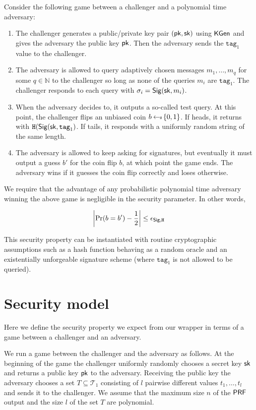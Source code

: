 \documentclass[12pt]{article}
\begin{document}
Consider the following game between a challenger and a polynomial time adversary:

\begin{enumerate}
\item The challenger generates a public/private key pair $(\mathsf{pk}, \mathsf{sk})$ using $\mathsf{KGen}$ and gives the adversary the public key $\mathsf{pk}$. Then the adversary sends the $\mathrm{\texttt{tag}_1}$ value to the challenger.

\item The adversary is allowed to query adaptively chosen messages $m_1,
	\dots , m_q$ for some $q \in \mathbb{N}$ to the challenger so long as none of the queries $m_i$ are $\texttt{tag}_1$. The
		challenger responds to each query with $\sigma_{i}=
		\mathsf{Sig}{(\mathsf{sk}, m_i})$. 

\item When the adversary decides to, it outputs a so-called test query. At this point, the challenger flips an unbiased coin $b \hskip2.3pt{\gets\!\!\mbox{\tiny${\$}$\normalsize}}\, \{0, 1\}$. If heads, it returns with $ \texttt{H}(\mathsf{Sig} (\mathsf{sk}, \mathrm{\texttt{tag}_1})$. If tails, it responds with a uniformly random string of the same length.

\item The adversary is allowed to keep asking for signatures, but eventually it must output a guess $b'$ for the coin flip $b$, at which point the game ends. The adversary wins if it guesses the coin flip correctly and loses otherwise.
\end{enumerate}

We require that the advantage of any probabilistic polynomial time adversary winning the above game is negligible in the security parameter. In other words,

$$\left \vert \Pr(b = b') -\frac{1}{2} \right \vert \le \epsilon_{\mathsf{Sig}, \texttt{H}}$$

This security property can be instantiated with routine cryptographic assumptions such as a hash function behaving as a random oracle and an existentially unforgeable signature scheme (where $\texttt{tag}_1$ is not allowed to be queried).

\section{Security model} \label{sec:model}
Here we define the security property we expect from our wrapper in terms of a game between a challenger and an adversary.

We run a game between the challenger and the adversary as follows. At the beginning of the game the challenger uniformly randomly chooses a secret key $\mathsf{sk}$ and returns a public key $\mathsf{pk}$ to the adversary. Receiving the public key the adversary chooses a set $T \subseteq \mathcal{T}_1$ consisting of $l$ pairwise different values $t_1,\ldots,t_l$ and sends it to the challenger.  We assume that the maximum size $n$ of the $\mathsf{PRF}$ output and the size $l$ of the set $T$ are polynomial. 
\end{document}
